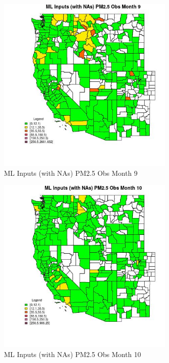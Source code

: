 \begin{figure} 
\centering  
\includegraphics[width=0.77\textwidth]{Code_Outputs/Report_ML_input_PM25_Step4_part_e_de_duplicated_aves_compiled_2019-05-21wNAs_CountyPM25_ObsmedianMonth9.jpg} 
\caption{\label{fig:Report_ML_input_PM25_Step4_part_e_de_duplicated_aves_compiled_2019-05-21wNAsCountyPM25_ObsmedianMonth9}ML Inputs (with NAs) PM2.5 Obs Month 9} 
\end{figure} 
 

\begin{figure} 
\centering  
\includegraphics[width=0.77\textwidth]{Code_Outputs/Report_ML_input_PM25_Step4_part_e_de_duplicated_aves_compiled_2019-05-21wNAs_CountyPM25_ObsmedianMonth10.jpg} 
\caption{\label{fig:Report_ML_input_PM25_Step4_part_e_de_duplicated_aves_compiled_2019-05-21wNAsCountyPM25_ObsmedianMonth10}ML Inputs (with NAs) PM2.5 Obs Month 10} 
\end{figure} 
 

